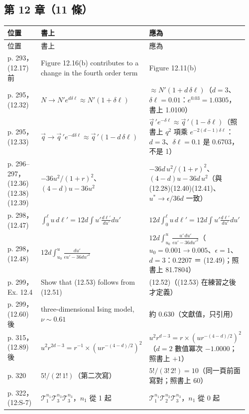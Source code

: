 \subsection{第 12 章（11 條）}
{\footnotesize\renewcommand{\arraystretch}{1.1}\setlength{\tabcolsep}{4pt}
\begin{longtable}{@{}>{\raggedright\arraybackslash}p{0.21\linewidth}>{\raggedright\arraybackslash}p{0.34\linewidth}>{\raggedright\arraybackslash}p{0.41\linewidth}@{}}
\toprule 位置 & 書上 & 應為\\ \midrule\endfirsthead
\toprule 位置 & 書上 & 應為\\ \midrule\endhead
\bottomrule\endfoot
p. 293，(12.17) 前 & Figure 12.16(b) contributes to a change in the fourth order term & Figure 12.11(b)\\
p. 295，(12.32) & $N\to N'e^{d\delta\ell}\approx N'(1+\delta\ell)$ & $\approx N'(1+d\,\delta\ell)$（$d=3$、$\delta\ell=0.01$：$e^{0.03}=1.0305$，書上 1.0100）\\
p. 295，(12.33) & $\vec q\to\vec q\,'e^{-d\delta\ell}\approx\vec q\,'(1-d\,\delta\ell)$ & $\vec q\,'e^{-\delta\ell}\approx\vec q\,'(1-\delta\ell)$（照書上 $q^2$ 項乘 $e^{-2(d-1)\delta\ell}$：$d=3$、$\delta\ell=0.1$ 是 0.6703，不是 1）\\
p. 296–297，(12.36)(12.38)(12.39) & $-36u^2/(1+r)^2$、$(4-d)u-36u^2$ & $-36d\,u^2/(1+r)^2$、$(4-d)u-36d\,u^2$（與 (12.28)(12.40)(12.41)、$u^*\to\epsilon/36d$ 一致）\\
p. 298，(12.47) & $\int_0^\ell u\,d\ell'=12d\int u'\frac{d\ell'}{du'}du'$ & $12d\int_0^\ell u\,d\ell'=12d\int u'\frac{d\ell'}{du'}du'$\\
p. 298，(12.48) & $12d\int_{u_0}^u\frac{du'}{\epsilon u'-36du'^2}$ & $12d\int_{u_0}^u\frac{u'\,du'}{\epsilon u'-36du'^2}$（$u_0=0.001\to0.005$、$\epsilon=1$、$d=3$：0.2207 ＝ (12.49)；照書上 81.7804）\\
p. 299，Ex. 12.4 & Show that (12.53) follows from (12.51) & (12.52)（(12.53) 在練習之後才定義）\\
p. 299，(12.60) 後 & three-dimensional Ising model, $\nu\sim0.61$ & 約 0.630（文獻值，只引用）\\
p. 315，(12.89) 後 & $u^2r^{2d-3}=r^{-1}\times(ur^{-(4-d)/2})^2$ & $u^2r^{d-3}=r\times(ur^{-(4-d)/2})^2$（$d=2$ 數值冪次 $-1.0000$；照書上 $+1$）\\
p. 320 & $5!/(2!\,1!)$（第二次寫） & $5!/(3!\,2!)=10$（同一頁前面寫對；照書上 60）\\
p. 322，(12:S-7) & $\mathcal T_1^{n_1}\mathcal T_3^{n_3}\mathcal T_3^{n_3}$，$n_1$ 從 1 起 & $\mathcal T_1^{n_1}\mathcal T_2^{n_2}\mathcal T_3^{n_3}$，$n_1$ 從 0 起\\
\end{longtable}}
